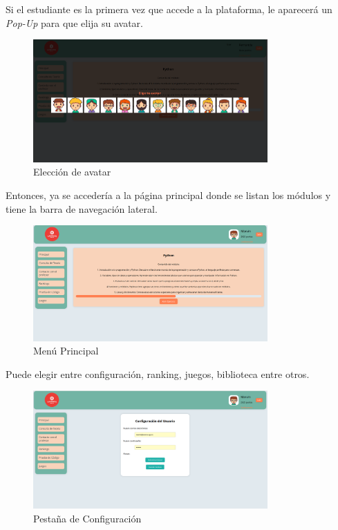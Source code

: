 \begin{appendices}
Si el estudiante es la primera vez que accede a la plataforma, le aparecerá un \textit{Pop-Up} para que elija su avatar.

\begin{figure}[H]
    \centering
    \includegraphics[width=0.8\textwidth]{imagenes/Manual/eleccion.png}
    \caption{Elección de avatar}
\end{figure}

Entonces, ya se accedería a la página principal donde se listan los módulos y tiene la barra de navegación lateral. 

\begin{figure}[H]
    \centering
    \includegraphics[width=0.8\textwidth]{imagenes/Manual/principal.png}
    \caption{Menú Principal}
\end{figure}

Puede elegir entre configuración, ranking, juegos, biblioteca entre otros.

\begin{figure}[H]
    \centering
    \includegraphics[width=0.8\textwidth]{imagenes/Manual/configuracion.png}
    \caption{Pestaña de Configuración}
\end{figure}


\end{appendices}

